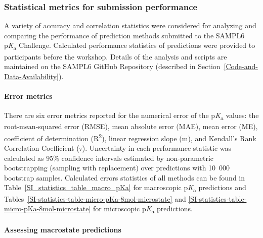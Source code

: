 \documentclass[9pt,lineno,final]{elife}
\newcommand{\pKa}{p\textit{K}\textsubscript{a}}
\begin{document}
\subsubsection{Statistical metrics for submission performance}

A variety of accuracy and correlation statistics were considered for analyzing and comparing the performance of prediction methods submitted to the SAMPL6 \pKa{} Challenge. 
Calculated performance statistics of predictions were provided to participants before the workshop. 
Details of the analysis and scripts are maintained on the SAMPL6 GitHub Repository (described in Section~\ref{Code-and-Data-Availability}).

\paragraph{Error metrics}

There are six error metrics reported for the numerical error of the \pKa{} values: the root-mean-squared error (RMSE), mean absolute error (MAE), mean error (ME), coefficient of determination (R\textsuperscript{2}), linear regression slope (m), and Kendall’s Rank Correlation Coefficient ($\tau$).
Uncertainty in each performance statistic was calculated as 95\% confidence intervals estimated by non-parametric bootstrapping (sampling with replacement) over predictions with 10~000 bootstrap samples. 
Calculated errors statistics of all methods can be found in Table~\ref{SI_statistics_table_macro_pKa} for macroscopic \pKa{} predictions and Tables~\ref{SI-statistics-table-micro-pKa-8mol-microstate} and \ref{SI-statistics-table-micro-pKa-8mol-microstate} for microscopic \pKa{} predictions. 

\paragraph{Assessing macrostate predictions}
\end{document}
